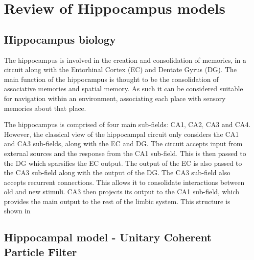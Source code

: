 \section{Review of Hippocampus models}
\subsection{Hippocampus biology}
The hippocampus \cite{andersen2006hippocampus}  is involved in the creation and consolidation of memories, in a circuit along with the Entorhinal Cortex (EC) and Dentate Gyrus (DG).
The main function of the hippocampus is thought to be the consolidation of associative memories and spatial memory.
As such it can be considered suitable for navigation within an environment, associating each place with sensory memories about that place.

The hippocampus is comprised of four main sub-fields: CA1, CA2, CA3 and CA4.
However, the classical view of the hippocampal circuit only considers the CA1 and CA3 sub-fields, along with the EC and DG.
The circuit accepts input from external sources and the response from the CA1 sub-field.
This is then passed to the DG which sparsifies the EC output.
The output of the EC is also passed to the CA3 sub-field along with the output of the DG.
The CA3 sub-field also accepts recurrent connections.
This allows it to consolidate interactions between old
 and new stimuli.
CA3 then projects its output to the CA1 sub-field, which provides the main output to the rest of the limbic system.
This structure is shown in 


\subsection{Hippocampal model - Unitary Coherent Particle Filter}
\label{subsubsec:ucpf}

